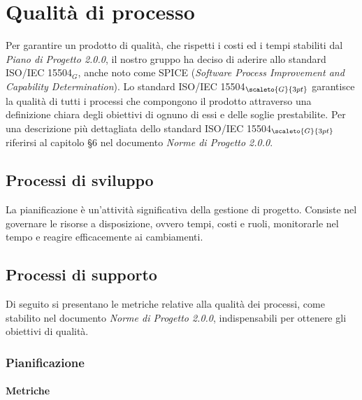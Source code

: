 \chapter{Qualità di processo}\label{QualitàDelProcesso}
Per garantire un prodotto di qualità, che rispetti i costi ed i tempi stabiliti dal \textit{Piano di Progetto 2.0.0}, il nostro gruppo ha deciso di aderire allo standard ISO/IEC 15504$_G$, anche noto come SPICE (\textit{Software Process Improvement and Capability Determination}).
Lo standard ISO/IEC 15504$_{\scaleto{G}{3pt}}$ garantisce la qualità di tutti i processi che compongono il prodotto attraverso una definizione chiara degli obiettivi di ognuno di essi e delle soglie prestabilite.
Per una descrizione più dettagliata dello standard ISO/IEC 15504$_{\scaleto{G}{3pt}}$
riferirsi al capitolo §6 nel documento \textit{Norme di Progetto 2.0.0}.
\section{Processi di sviluppo}\label{QualitàDelProcessoProcessoDiPianificazione}
La pianificazione è un’attività significativa della gestione di progetto.
Consiste nel governare le risorse a disposizione, ovvero tempi, costi e ruoli, monitorarle nel tempo e reagire efficacemente ai cambiamenti.

\section{Processi di supporto}\label{QualitàDelProcessoProcessiDiSupporto}
Di seguito si presentano le metriche relative alla qualità dei processi, come stabilito nel
documento \textit{Norme di Progetto 2.0.0}, indispensabili per ottenere gli obiettivi di qualità.
\subsection{Pianificazione}\label{QualitàDelProcessoProcessiDiSupportoPianificazione}
\subsubsection{Metriche}\label{MetricheProcessiDiSupporto}

